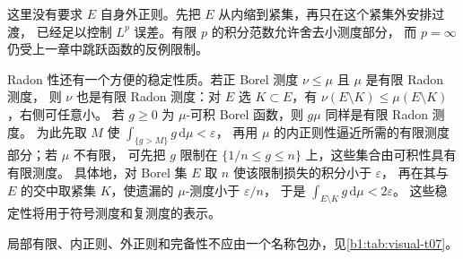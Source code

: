 这里没有要求 \(E\) 自身外正则。先把 \(E\) 从内缩到紧集，再只在这个紧集外安排过渡，
已经足以控制 \(L^p\) 误差。有限 \(p\) 的积分范数允许舍去小测度部分，
而 \(p=\infty\) 仍受上一章中跳跃函数的反例限制。

\ProseParagraphBreak

Radon 性还有一个方便的稳定性质。若正 Borel 测度 \(\nu\leq\mu\) 且 \(\mu\) 是有限 Radon 测度，
则 \(\nu\) 也是有限 Radon 测度：对 \(E\) 选 \(K\subset E\)，有
\(\nu(E\setminus K)\leq\mu(E\setminus K)\)，右侧可任意小。
若 \(g\geq0\) 为 \(\mu\)-可积 Borel 函数，则 \(g\mu\) 同样是有限 Radon 测度。
为此先取 \(M\) 使 \(\int_{\{g>M\}}g\,\mathrm d\mu<\varepsilon\)，
再用 \(\mu\) 的内正则性逼近所需的有限测度部分；若 \(\mu\) 不有限，
可先把 \(g\) 限制在 \(\{1/n\leq g\leq n\}\) 上，这些集合由可积性具有有限测度。
具体地，对 Borel 集 \(E\) 取 \(n\) 使该限制损失的积分小于 \(\varepsilon\)，
再在其与 \(E\) 的交中取紧集 \(K\)，使遗漏的 \(\mu\)-测度小于 \(\varepsilon/n\)，
于是 \(\int_{E\setminus K}g\,\mathrm d\mu<2\varepsilon\)。
这些稳定性将用于符号测度和复测度的表示。

局部有限、内正则、外正则和完备性不应由一个名称包办，见\cref{b1:tab:visual-t07}。

